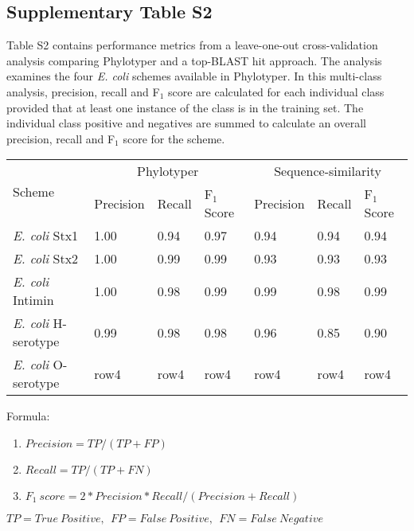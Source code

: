 \documentclass[12pt,letterpaper]{article}
\begin{document}
\subsection{Supplementary Table S2}

Table S2 contains performance metrics from a leave-one-out cross-validation analysis comparing Phylotyper and a top-BLAST hit approach.  The analysis examines the four \textit{E. coli} schemes available in Phylotyper. In this multi-class analysis, precision, recall and F$_{1}$ score are calculated for each individual class provided that at least one instance of the class is in the training set.  The individual class positive and negatives are summed to calculate an overall precision, recall and F$_{1}$ score for the scheme.

\begin{minipage}{\linewidth}
\medskip
\begin{tabular}{@{\extracolsep{2pt}}lllllll@{}}
\toprule 
\multirow{2}{*}{Scheme} & \multicolumn{3}{c}{Phylotyper} & \multicolumn{3}{c}{Sequence-similarity}\\
\cline{2-4}\cline{5-7}
& Precision & Recall & F$_{1}$ Score & Precision & Recall & F$_{1}$ Score \\
\midrule
{\it E. coli} Stx1 & 1.00 & 0.94 & 0.97 & 0.94 & 0.94 & 0.94\\
{\it E. coli} Stx2 & 1.00 & 0.99 & 0.99 & 0.93 & 0.93 & 0.93\\
{\it E. coli} Intimin & 1.00 & 0.98 & 0.99 & 0.99 & 0.98 & 0.99\\
{\it E. coli} H-serotype & 0.99 & 0.98 & 0.98 & 0.96 & 0.85 & 0.90\\
{\it E. coli} O-serotype & row4 & row4 & row4 & row4 & row4 & row4\\\bottomrule
\end{tabular}\par
\bigskip
Formula:
\begin{enumerate}
\item $Precision = TP / (TP + FP)$
\item $Recall = TP / (TP + FN)$
\item $F_{1}~score = 2*Precision*Recall/(Precision + Recall)$
\end{enumerate}
$TP = True~Positive,~~FP = False~Positive,~~FN = False~Negative$

\end{minipage}
\end{document}
